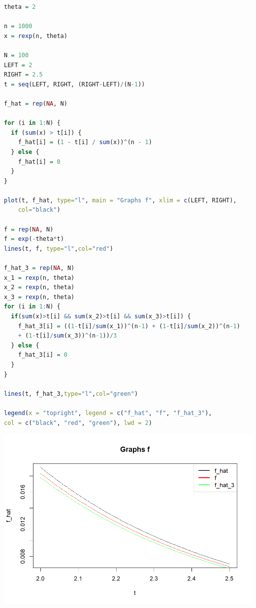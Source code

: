 \documentclass[12pt]{extreport}
\theoremstyle{definiton}
\theoremstyle{definition}
\theoremstyle{definition}
\newcounter{problem}
\renewcommand{\theproblem}{\arabic{problem}}
\newcommand{\problemname}{\color{blue} Задача}
\newenvironment{problem}[1]{
	\addtocounter{problem}{1}\noindent{\large\bfseries \problemname{} \theproblem \,.
		}
}{
	\par\bigskip
}
\begin{document}
\begin{problem}{5}
\begin{lstlisting}[language=R]
theta = 2

n = 1000
x = rexp(n, theta)

N = 100
LEFT = 2
RIGHT = 2.5
t = seq(LEFT, RIGHT, (RIGHT-LEFT)/(N-1))

f_hat = rep(NA, N)

for (i in 1:N) {
  if (sum(x) > t[i]) {
    f_hat[i] = (1 - t[i] / sum(x))^(n - 1)
  } else {
    f_hat[i] = 0
  }
}

plot(t, f_hat, type="l", main = "Graphs f", xlim = c(LEFT, RIGHT),
	col="black")

f = rep(NA, N)
f = exp(-theta*t)
lines(t, f, type="l",col="red")

f_hat_3 = rep(NA, N)
x_1 = rexp(n, theta)
x_2 = rexp(n, theta)
x_3 = rexp(n, theta)
for (i in 1:N) {
  if(sum(x)>t[i] && sum(x_2)>t[i] && sum(x_3)>t[i]) {
    f_hat_3[i] = ((1-t[i]/sum(x_1))^(n-1) + (1-t[i]/sum(x_2))^(n-1) 
	+ (1-t[i]/sum(x_3))^(n-1))/3
  } else {
    f_hat_3[i] = 0
  }
}

lines(t, f_hat_3,type="l",col="green")

legend(x = "topright", legend = c("f_hat", "f", "f_hat_3"),
col = c("black", "red", "green"), lwd = 2) 
\end{lstlisting}
\includegraphics[scale=0.6]{task_2_f.png}
\end{problem}
\end{document}
